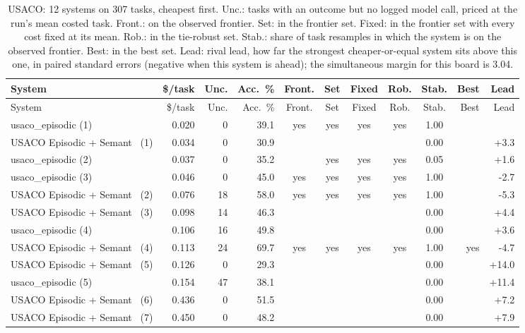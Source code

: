 {\begin{longtable}{lrrrcccccrr}
\caption{USACO: 12 systems on 307 tasks, cheapest first. Unc.: tasks with an outcome but no logged model call, priced at the run's mean costed task. Front.: on the observed frontier. Set: in the frontier set. Fixed: in the frontier set with every cost fixed at its mean. Rob.: in the tie-robust set. Stab.: share of task resamples in which the system is on the observed frontier. Best: in the best set. Lead: rival lead, how far the strongest cheaper-or-equal system sits above this one, in paired standard errors (negative when this system is ahead); the simultaneous margin for this board is 3.04.}\label{tab:supp-hal_usaco}\\
\toprule
System & \$/task & Unc. & Acc.\ \% & Front. & Set & Fixed & Rob. & Stab. & Best & Lead \\
\midrule
\endfirsthead
\toprule
System & \$/task & Unc. & Acc.\ \% & Front. & Set & Fixed & Rob. & Stab. & Best & Lead \\
\midrule
\endhead
\bottomrule
\endfoot
usaco\_episodic (1) & 0.020 & 0 & 39.1 & yes & yes & yes & yes & 1.00 &  &  \\
USACO Episodic + Semant~ (1) & 0.034 & 0 & 30.9 &  &  &  &  & 0.00 &  & +3.3 \\
usaco\_episodic (2) & 0.037 & 0 & 35.2 &  & yes & yes & yes & 0.05 &  & +1.6 \\
usaco\_episodic (3) & 0.046 & 0 & 45.0 & yes & yes & yes & yes & 1.00 &  & -2.7 \\
USACO Episodic + Semant~ (2) & 0.076 & 18 & 58.0 & yes & yes & yes & yes & 1.00 &  & -5.3 \\
USACO Episodic + Semant~ (3) & 0.098 & 14 & 46.3 &  &  &  &  & 0.00 &  & +4.4 \\
usaco\_episodic (4) & 0.106 & 16 & 49.8 &  &  &  &  & 0.00 &  & +3.6 \\
USACO Episodic + Semant~ (4) & 0.113 & 24 & 69.7 & yes & yes & yes & yes & 1.00 & yes & -4.7 \\
USACO Episodic + Semant~ (5) & 0.126 & 0 & 29.3 &  &  &  &  & 0.00 &  & +14.0 \\
usaco\_episodic (5) & 0.154 & 47 & 38.1 &  &  &  &  & 0.00 &  & +11.4 \\
USACO Episodic + Semant~ (6) & 0.436 & 0 & 51.5 &  &  &  &  & 0.00 &  & +7.2 \\
USACO Episodic + Semant~ (7) & 0.450 & 0 & 48.2 &  &  &  &  & 0.00 &  & +7.9 \\
\end{longtable}
}

